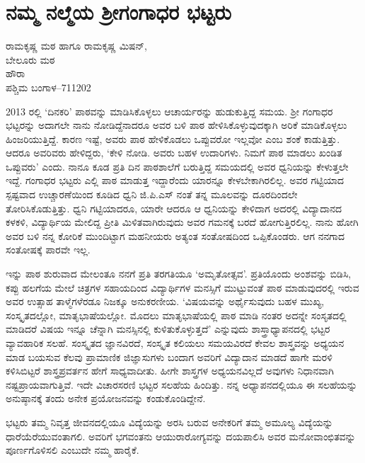 {\fontsize{14}{16}\selectfont
\chapter{ನಮ್ಮ ನಲ್ಮೆಯ ಶ್ರೀಗಂಗಾಧರ ಭಟ್ಟರು}

\begin{center}
\smallskip

ರಾಮಕೃಷ್ಣ ಮಠ ಹಾಗೂ ರಾಮಕೃಷ್ಣ ಮಿಷನ್,\\
ಬೇಲೂರು ಮಠ \\
ಹೌರಾ \\ 
ಪಶ್ಚಿಮ ಬಂಗಾಳ–711202
\addrule
\end{center}

2013 ರಲ್ಲಿ `ದಿನಕರಿ' ಪಾಠವನ್ನು ಮಾಡಿಸಿಕೊಳ್ಳಲು ಆಚಾರ್ಯರನ್ನು ಹುಡುಕುತ್ತಿದ್ದ ಸಮಯ. ಶ್ರೀ ಗಂಗಾಧರ ಭಟ್ಟರನ್ನು ಅದಾಗಲೇ ನಾನು ನೋಡಿದ್ದೆನಾದರೂ ಅವರ ಬಳಿ ಪಾಠ ಹೇಳಿಸಿಕೊಳ್ಳುವುದಕ್ಕಾಗಿ ಅರಿಕೆ ಮಾಡಿಕೊಳ್ಳಲು ಹಿಂಜರಿಯುತ್ತಿದ್ದೆ. ಕಾರಣ ಇಷ್ಟೆ, ಅವರು ಪಾಠ ಹೇಳಿಕೊಡಲು ಒಪ್ಪುವರೋ ಇಲ್ಲವೋ ಎಂಬ ಶಂಕೆ ಕಾಡುತ್ತಿತ್ತು. ಆದರೂ ಅವರಿವರು ಹೇಳಿದ್ದರು, `ಕೇಳಿ ನೋಡಿ. ಅವರು ಬಹಳ ಉದಾರಿಗಳು. ನಿಮಗೆ ಪಾಠ ಮಾಡಲು ಖಂಡಿತ ಒಪ್ಪುವರು' ಎಂದು. ನಾನೂ ಕೂಡ ಪ್ರತಿ ದಿನ ಪಾಠಶಾಲೆಗೆ ಬರುತ್ತಿದ್ದ ಸಮಯದಲ್ಲಿ ಅವರ ಧ್ವನಿಯನ್ನು ಕೇಳುತ್ತಲೇ ಇದ್ದೆ. ಗಂಗಾಧರ ಭಟ್ಟರು ಎಲ್ಲಿ ಪಾಠ ಮಾಡುತ್ತ ಇದ್ದಾರೆಂದು ಯಾರನ್ನೂ ಕೇಳಬೇಕಾಗಿರಲಿಲ್ಲ. ಅವರ ಗಟ್ಟಿಯಾದ ಸ್ಪಷ್ಟವಾದ ಉಚ್ಚಾರಣೆಯಿಂದ ಕೂಡಿದ ಧ್ವನಿ ಜಿ.ಪಿ.ಎಸ್ ನಂತೆ ತನ್ನ ಮೂಲವನ್ನು ದೂರದಿಂದಲೇ ತೋರಿಸಿಕೊಡುತ್ತಿತ್ತು. ಧ್ವನಿ ಗಟ್ಟಿಯಾದರೂ, ಯಾರೇ ಆದರೂ ಆ ಧ್ವನಿಯನ್ನು ಕೇಳಿದಾಗ ಅದರಲ್ಲಿ ವಿದ್ಯಾದಾನದ ಕಳಕಳಿ, ವಿದ್ಯಾರ್ಥಿಯ ಮೇಲಿದ್ದ ಪ್ರೀತಿ ಮಿಳಿತವಾಗಿರುವುದು ಅವರ  ಗಮನಕ್ಕೆ ಬರದೆ ಹೋಗುತ್ತಿರಲಿಲ್ಲ. ನಾನು ಹೋಗಿ ಅವರ ಬಳಿ ನನ್ನ ಕೋರಿಕೆ ಮುಂದಿಟ್ಟಾಗ ಮಹನೀಯರು ಅತ್ಯಂತ ಸಂತೋಷದಿಂದ ಒಪ್ಪಿಕೊಂಡರು. ಆಗ ನನಗಾದ ಸಂತೋಷಕ್ಕೆ ಪಾರವೇ ಇಲ್ಲ. 

ಇನ್ನು ಪಾಠ ಶುರುವಾದ ಮೇಲಂತೂ ನನಗೆ ಪ್ರತಿ ತರಗತಿಯೂ `ಅಮೃತೋತ್ಸವ'. ಪ್ರತಿಯೊಂದು ಅಂಶವನ್ನು ಬಿಡಿಸಿ, ಕಪ್ಪು ಹಲಗೆಯ ಮೇಲೆ ಚಿತ್ರಗಳ ಸಹಾಯದಿಂದ ವಿದ್ಯಾರ್ಥಿಗಳ ಮನಸ್ಸಿಗೆ ಮುಟ್ಟುವಂತೆ ಪಾಠ ಮಾಡುವುದರಲ್ಲಿ ಇರುವ ಅವರ ಉತ್ಸಾಹ ತಾಳ್ಮೆಗಳೆರಡೂ ನಿಜಕ್ಕೂ ಅನುಕರಣೀಯ.  `ವಿಷಯವನ್ನು ಅರ್ಥೈಸುವುದು ಬಹಳ ಮುಖ್ಯ, ಸಂಸ್ಕೃತದಲ್ಲೋ, ಮಾತೃಭಾಷೆಯಲ್ಲೋ. ಮೊದಲು ಮಾತೃಭಾಷೆಯಲ್ಲಿ ಪಾಠ ಮಾಡಿ ನಂತರ ಅದನ್ನೇ ಸಂಸೃತದಲ್ಲಿ ಮಾಡಿದರೆ ವಿಷಯ ಇನ್ನೂ ಚೆನ್ನಾಗಿ ಮನಸ್ಸಿನಲ್ಲಿ ಕುಳಿತುಕೊಳ್ಳುತ್ತದೆ' ಎನ್ನುವುದು ಶಾಸ್ತ್ರಾಧ್ಯಾಪನದಲ್ಲಿ ಭಟ್ಟರ ವ್ಯಾವಹಾರಿಕ ಸಲಹೆ. ಸಂಸ್ಕೃತದ ಜ್ಞಾನವಿರದೆ, ಸಂಸ್ಕೃತ ಕಲಿಯಲು ಸಮಯವಿರದೆ  ಕೇವಲ ಶಾಸ್ತ್ರವನ್ನು ಅಧ್ಯಯನ ಮಾಡ ಬಯಸುವ ಕೆಲವು ಪ್ರಾಮಾಣಿಕ ಜಿಜ್ಞಾಸುಗಳು ಬಂದಾಗ ಅವರಿಗೆ ವಿದ್ಯಾದಾನ ಮಾಡದೆ ಹಾಗೇ ಮರಳಿ ಕಳಿಸಿಬಿಟ್ಟರೆ ಶಾಸ್ತ್ರಪ್ರವರ್ತನ ಹೇಗೆ ಸಾಧ್ಯವಾದೀತು. ಹೀಗೇ ಶಾಸ್ತ್ರಗಳ ಅಧ್ಯಯನವಿಲ್ಲದೆ ಅವುಗಳು ನಿಧಾನವಾಗಿ ನಷ್ಟಪ್ರಾಯವಾಗುತ್ತಿವೆ. ಇದೇ ವಿಚಾರಸರಣಿ ಭಟ್ಟರ ಸಲಹೆಯ ಹಿಂದಿತ್ತು. ನನ್ನ ಅಧ್ಯಾಪನದಲ್ಲಿಯೂ ಈ ಸಲಹೆಯನ್ನು ಅನುಷ್ಠಾನಕ್ಕೆ ತಂದು ಅನೇಕ ಪ್ರಯೋಜನವನ್ನು ಕಂಡುಕೊಂಡಿದ್ದೇನೆ. 

ಭಟ್ಟರು ತಮ್ಮ ನಿವೃತ್ತ ಜೀವನದಲ್ಲಿಯೂ ವಿದ್ಯೆಯನ್ನು ಅರಸಿ ಬರುವ ಅನೇಕರಿಗೆ ತಮ್ಮ ಅಮೂಲ್ಯ ವಿದ್ಯೆಯನ್ನು ಧಾರೆಯೆರೆಯುವಂತಾಗಲಿ. ಅವರಿಗೆ ಭಗವಂತನು ಆಯುರಾರೋಗ್ಯವನ್ನು ದಯಪಾಲಿಸಿ ಅವರ ಮನೋವಾಂಛಿತವನ್ನು ಪೂರ್ಣಗೊಳಿಸಲಿ ಎಂಬುದೇ ನಮ್ಮ ಹಾರೈಕೆ.

\articleend
}
